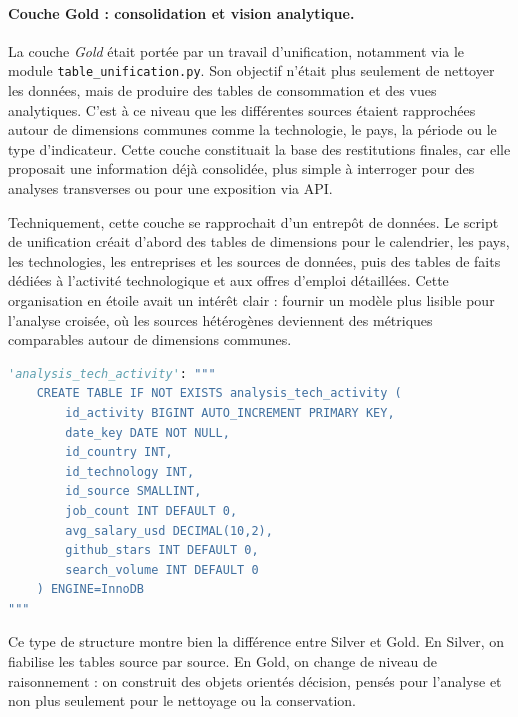 \documentclass{article}
\begin{document}
\paragraph{Couche Gold : consolidation et vision analytique.}
La couche \textit{Gold} était portée par un travail d'unification, notamment via
le module \texttt{table\_unification.py}. Son objectif n'était plus seulement de
nettoyer les données, mais de produire des tables de consommation et des vues
analytiques. C'est à ce niveau que les différentes sources étaient rapprochées
autour de dimensions communes comme la technologie, le pays, la période ou le
type d'indicateur. Cette couche constituait la base des restitutions finales, car
elle proposait une information déjà consolidée, plus simple à interroger pour des
analyses transverses ou pour une exposition via API.

Techniquement, cette couche se rapprochait d'un entrepôt de données. Le script de
unification créait d'abord des tables de dimensions pour le calendrier, les pays,
les technologies, les entreprises et les sources de données, puis des tables de
faits dédiées à l'activité technologique et aux offres d'emploi détaillées. Cette
organisation en étoile avait un intérêt clair : fournir un modèle plus lisible
pour l'analyse croisée, où les sources hétérogènes deviennent des métriques
comparables autour de dimensions communes.

\begin{lstlisting}[language=Python,caption={Extrait de la couche Gold : création d'une table de faits orientée analyse.}]
'analysis_tech_activity': """
    CREATE TABLE IF NOT EXISTS analysis_tech_activity (
        id_activity BIGINT AUTO_INCREMENT PRIMARY KEY,
        date_key DATE NOT NULL,
        id_country INT,
        id_technology INT,
        id_source SMALLINT,
        job_count INT DEFAULT 0,
        avg_salary_usd DECIMAL(10,2),
        github_stars INT DEFAULT 0,
        search_volume INT DEFAULT 0
    ) ENGINE=InnoDB
"""
\end{lstlisting}

Ce type de structure montre bien la différence entre Silver et Gold. En Silver,
on fiabilise les tables source par source. En Gold, on change de niveau de
raisonnement : on construit des objets orientés décision, pensés pour l'analyse
et non plus seulement pour le nettoyage ou la conservation.
\end{document}
